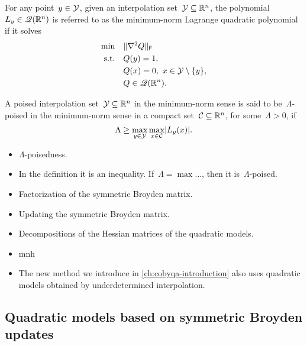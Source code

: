\begin{definition}
    \label{def:lagrange-polynomials-minimum-norm}
    For any point~$y \in \xpt$, given an interpolation set~$\xpt \subseteq \R^n$, the polynomial~$\lagp[y] \in \qpoly$ is referred to as the minimum-norm Lagrange quadratic polynomial if it solves
    \begin{align*}
        \min        & \quad \norm{\nabla^2 Q}_{\mathsf{F}}\\
        \text{s.t.} & \quad Q(y) = 1,\\
                    & \quad Q(x) = 0, ~ x \in \xpt \setminus \set{y},\\
                    & \quad Q \in \qpoly.
    \end{align*}
\end{definition}

\begin{definition}
    \label{def:lambda-poisedness-minimum-norm}
    A poised interpolation set~$\xpt \subseteq \R^n$ in the minimum-norm sense is said to be~$\Lambda$-poised in the minimum-norm sense in a compact set~$\mathcal{C} \subseteq \mathbb{R}^n$, for some~$\Lambda > 0$, if
    \begin{equation*}
        \Lambda \ge \max_{y \in \xpt} \max_{x \in \mathcal{C}} \abs{\lagp[y](x)}.
    \end{equation*}
\end{definition}

\begin{itemize}
    \item $\Lambda$-poisedness.
    \item In the definition it is an inequality. If~$\Lambda = \max \dots$, then it is~$\Lambda$-poised.
    \item Factorization of the symmetric Broyden matrix.
    \item Updating the symmetric Broyden matrix.
    \item Decompositions of the Hessian matrices of the quadratic models.
    \item \gls{mnh}~\cite{Wild_2008}
    \item The new method we introduce in \cref{ch:cobyqa-introduction} also uses quadratic models obtained by underdetermined interpolation.
\end{itemize}

\subsection{Quadratic models based on symmetric Broyden updates}
\label{subsec:symmetric-broyden-updates}

